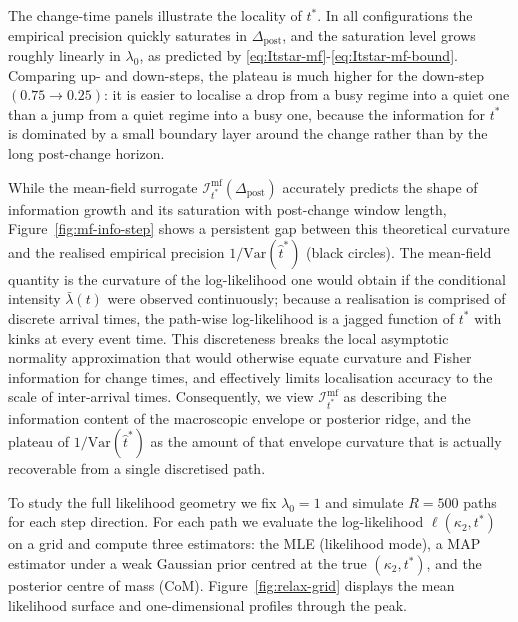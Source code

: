 \documentclass{article}
\theoremstyle{plain}
\theoremstyle{definition}
\newcommand{\Var}{\mathrm{Var}}
\newcommand{\1}{\mathbf{1}}
\begin{document}
The change-time panels illustrate the locality of $t^\ast$. In all configurations the empirical precision quickly saturates in $\Delta_{\text{post}}$, and the saturation level grows roughly linearly in $\lambda_0$, as predicted by \eqref{eq:Itstar-mf}-\eqref{eq:Itstar-mf-bound}. Comparing up- and down-steps, the plateau is much higher for the down-step $(0.75\to0.25)$: it is easier to localise a drop from a busy regime into a quiet one than a jump from a quiet regime into a busy one, because the information for $t^\ast$ is dominated by a small boundary layer around the change rather than by the long post-change horizon.

While the mean-field surrogate $\mathcal I_{t^\ast}^{\mathrm{mf}}(\Delta_{\mathrm{post}})$ accurately predicts the shape of information growth and its saturation with post-change window length, Figure~\ref{fig:mf-info-step} shows a persistent gap between this theoretical curvature and the realised empirical precision $1/\Var(\hat t^\ast)$ (black circles). The mean-field quantity is the curvature of the log-likelihood one would obtain if the conditional intensity $\bar\lambda(t)$ were observed continuously; because a realisation is comprised of discrete arrival times, the path-wise log-likelihood is a jagged function of $t^\ast$ with kinks at every event time. This discreteness breaks the local asymptotic normality approximation that would otherwise equate curvature and Fisher information for change times, and effectively limits localisation accuracy to the scale of inter-arrival times. Consequently, we view $\mathcal I_{t^\ast}^{\mathrm{mf}}$ as describing the information content of the macroscopic envelope or posterior ridge, and the plateau of $1/\Var(\hat t^\ast)$ as the amount of that envelope curvature that is actually recoverable from a single discretised path.

To study the full likelihood geometry we fix $\lambda_0=1$ and simulate $R=500$ paths for each step direction. For each path we evaluate the log-likelihood $\ell(\kappa_2,t^\ast)$ on a grid and compute three estimators: the MLE (likelihood mode), a MAP estimator under a weak Gaussian prior centred at the true $(\kappa_2,t^\ast)$, and the posterior centre of mass (CoM). Figure~\ref{fig:relax-grid} displays the mean likelihood surface and one-dimensional profiles through the peak.
\end{document}
